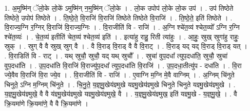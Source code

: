 \documentclass[17pt]{extarticle}
\begin{document}
1. अ॒मुष्मि॑न् ॅलो॒के लो॒के॑ ऽमुष्मि॑न् न॒मुष्मि॑न् ॅलो॒के । . लो॒क उपोप॑ लो॒के लो॒क उप॑ । . उप॑ तिष्ठेते तिष्ठेते॒ उपोप॑ तिष्ठेते । . ति॒ष्ठे॒ते॒ वि॒राजि॑ वि॒राजि॑ तिष्ठेते तिष्ठेते वि॒राजि॑ । . ति॒ष्ठे॒ते॒ इति॑ तिष्ठेते । . वि॒राज्य॒ग्नि र॒ग्निर् वि॒राजि॑ वि॒राज्य॒ग्निः । . वि॒राजीति॑ वि - राजि॑ । . अ॒ग्नि श्चे॑त॒व्य॑ श्चेत॒व्यो᳚ ऽग्नि र॒ग्नि श्चे॑त॒व्यः॑ । . चे॒त॒व्य॑ इतीति॑ चेत॒व्य॑ श्चेत॒व्य॑ इति॑ । . इत्या॑हु राहु॒ रिती त्या॑हुः । . आ॒हुः॒ स्रुख् स्रुगा॑हु राहुः॒ स्रुक् । . स्रुग् वै वै स्रुख् स्रुग् वै । . वै वि॒राड् वि॒राड् वै वै वि॒राट् । . वि॒राड् यद् यद् वि॒राड् वि॒राड् यत् । . वि॒राडिति॑ वि - राट् । . यथ् स्रुचौ॒ स्रुचौ॒ यद् यथ् स्रुचौ᳚ । . स्रुचा॑ वुप॒दधा᳚ त्युप॒दधा॑ति॒ स्रुचौ॒ स्रुचा॑ वुप॒दधा॑ति । . उ॒प॒दधा॑ति वि॒राजि॑ वि॒राज्यु॑प॒दधा᳚ त्युप॒दधा॑ति वि॒राजि॑ । . उ॒प॒दधा॒तीत्यु॑प - दधा॑ति । . वि॒रा ज्ये॒वैव वि॒राजि॑ वि॒रा ज्ये॒व । . वि॒राजीति॑ वि - राजि॑ । . ए॒वाग्नि म॒ग्नि मे॒वै वाग्निम् । . अ॒ग्निम् चि॑नुते चिनुते॒ ऽग्नि म॒ग्निम् चि॑नुते । . चि॒नु॒ते॒ य॒ज्ञ्॒मु॒खेय॑ज्ञ्मुखे यज्ञ्मु॒खेय॑ज्ञ्मुखे चिनुते चिनुते यज्ञ्मु॒खेय॑ज्ञ्मुखे । . य॒ज्ञ्॒मु॒खेय॑ज्ञ्मुखे॒ वै वै य॑ज्ञ्मु॒खेय॑ज्ञ्मुखे यज्ञ्मु॒खेय॑ज्ञ्मुखे॒ वै । . य॒ज्ञ्॒मु॒खेय॑ज्ञ्मुख॒ इति॑ यज्ञ्मु॒खे - य॒ज्ञ्॒मु॒खे॒ । . वै क्रि॒यमा॑णे क्रि॒यमा॑णे॒ वै वै क्रि॒यमा॑णे । \newline
\end{document}

